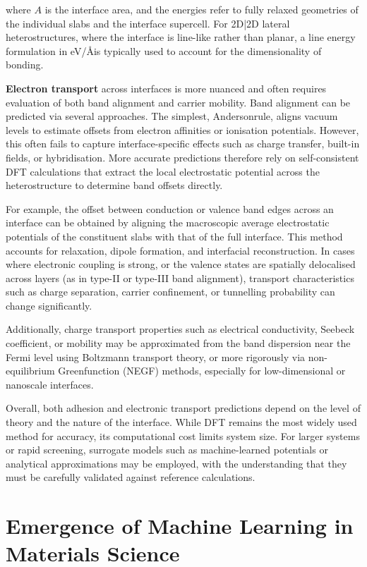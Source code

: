 where $A$ is the interface area, and the energies refer to fully relaxed geometries of the individual slabs and the interface supercell. For 2D|2D lateral heterostructures, where the interface is line-like rather than planar, a line energy formulation in eV/\AA is typically used to account for the dimensionality of bonding. 
 
\textbf{Electron transport} across interfaces is more nuanced and often requires evaluation of both band alignment and carrier mobility. Band alignment can be predicted via several approaches. The simplest, Anderson\rqss rule, aligns vacuum levels to estimate offsets from electron affinities or ionisation potentials. However, this often fails to capture interface-specific effects such as charge transfer, built-in fields, or hybridisation. More accurate predictions therefore rely on self-consistent DFT calculations that extract the local electrostatic potential across the heterostructure to determine band offsets directly. 
 
For example, the offset between conduction or valence band edges across an interface can be obtained by aligning the macroscopic average electrostatic potentials of the constituent slabs with that of the full interface. This method accounts for relaxation, dipole formation, and interfacial reconstruction. In cases where electronic coupling is strong, or the valence states are spatially delocalised across layers (as in type-II or type-III band alignment), transport characteristics such as charge separation, carrier confinement, or tunnelling probability can change significantly. 
 
Additionally, charge transport properties such as electrical conductivity, Seebeck coefficient, or mobility may be approximated from the band dispersion near the Fermi level using Boltzmann transport theory, or more rigorously via non-equilibrium Green\rqss function (NEGF) methods, especially for low-dimensional or nanoscale interfaces. 
 
Overall, both adhesion and electronic transport predictions depend on the level of theory and the nature of the interface. While DFT remains the most widely used method for accuracy, its computational cost limits system size. For larger systems or rapid screening, surrogate models such as machine-learned potentials or analytical approximations may be employed, with the understanding that they must be carefully validated against reference calculations. 
 
\section{Emergence of Machine Learning in Materials Science} \label{section:machine_learning} 
 
